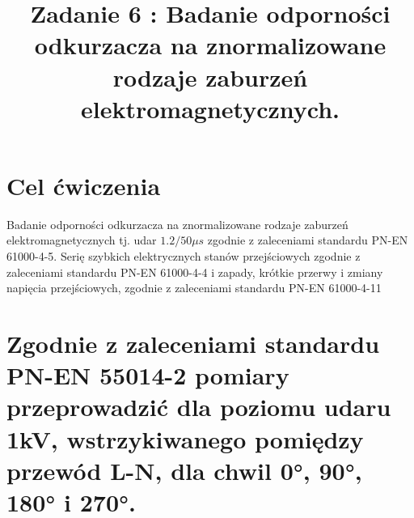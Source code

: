 \documentclass{classrep}
\author{
  \studentinfo{Witold Olechowski}{127517} \and
  \studentinfo{Grzegorz Pelczar}{125242} \and
  \studentinfo{Mateusz Kut}{125212} \and
  \studentinfo{Tomasz Marecik}{127374} 
}
\title{Zadanie 6 : Badanie  odporności odkurzacza na znormalizowane rodzaje zaburzeń elektromagnetycznych. }
\begin{document}
\maketitle

\section{Cel ćwiczenia}

Badanie  odporności odkurzacza na znormalizowane rodzaje zaburzeń elektromagnetycznych tj. udar $1.2/50 \mu s$ zgodnie z zaleceniami standardu PN-EN 61000-4-5. Serię szybkich elektrycznych stanów przejściowych zgodnie z zaleceniami standardu PN-EN 61000-4-4 i zapady, krótkie przerwy i zmiany napięcia przejściowych, zgodnie z zaleceniami standardu PN-EN 61000-4-11

\section{Zgodnie z zaleceniami standardu PN-EN 55014-2 pomiary przeprowadzić dla poziomu udaru 1kV, wstrzykiwanego pomiędzy przewód L-N, dla  chwil 0°, 90°, 180° i 270°.}
\end{document}
